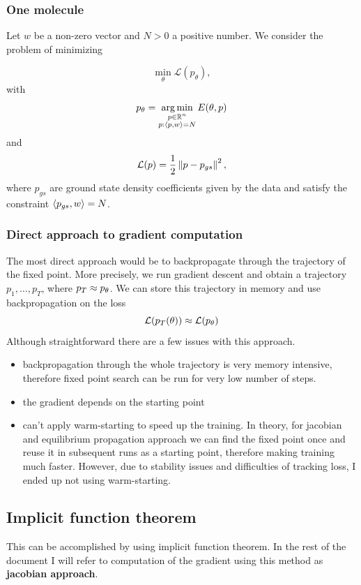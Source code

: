 \documentclass[a4paper,10pt]{report}
\begin{document}
\subsubsection{One molecule}
Let $w$ be a non-zero vector and $N>0$ a positive number.
We consider the problem of minimizing

\begin{equation}
 \min_\theta \mathcal{L}(p_\theta),
\end{equation}
with
\begin{equation}
p_\theta = \operatorname*{arg\,min}_{\substack{p \in \mathbb{R}^n \\ p: \langle p, w \rangle=N }} E(\theta, p)
\end{equation}
and
\begin{equation}
 \mathcal{L}(p) = \frac{1}{2} \left\|p-p_{gs}\right\|^2,
\end{equation}
where $p_{gs}$ are ground state density coefficients given by the data and satisfy the constraint $\langle p_{gs}, w \rangle = N$.


\subsubsection{Direct approach to gradient computation}
The most direct approach would be to backpropagate through the trajectory of the fixed point. More precisely, we run gradient descent and obtain a trajectory $p_1, \ldots, p_T$, where $p_T \approx p_\theta$. We can store this trajectory in memory and use backpropagation on the loss
\begin{equation}
 \mathcal{L}(p_T(\theta)) \approx \mathcal{L}(p_\theta)
\end{equation}
Although straightforward there are a few issues with this approach.
\begin{itemize}
 \item backpropagation through the whole trajectory is very memory intensive, therefore fixed point search can be run for very low number of steps.
 \item the gradient depends on the starting point
 \item can't apply warm-starting to speed up the training. In theory, for jacobian and equilibrium propagation approach we can find the fixed point once and reuse it in subsequent runs as a starting point, therefore making training much faster.
 However, due to stability issues and difficulties of tracking loss, I ended up not using warm-starting.
\end{itemize}


\subsection{Implicit function theorem}
This can be accomplished by using implicit function theorem. In the rest of the document I will refer to computation of the gradient using this method as \textbf{jacobian approach}.
\end{document}
